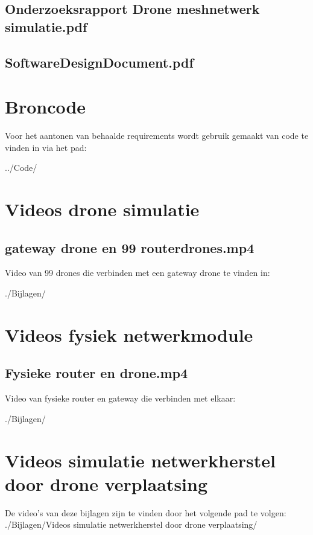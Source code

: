 \documentclass[a4paper, 11pt, oneside]{report}
\begin{document}
\section[Onderzoeksrapport Drone meshnetwerk simulatie]{Onderzoeksrapport Drone meshnetwerk simulatie.pdf}\label{sec:onderzoeksrapport-drone-meshnetwerk-simulatie}
\section[Softwaredesign document]{SoftwareDesignDocument.pdf}\label{sec:softwaredesigndocument}


\chapter{Broncode}
\label{app:broncode}
Voor het aantonen van behaalde requirements wordt gebruik gemaakt van code te vinden in via het pad:

../Code/

\chapter{Videos drone simulatie}
\section{gateway drone en 99 routerdrones.mp4}\label{sec:gateway-drone-en-99-routerdronesmp4}
Video van 99 drones die verbinden met een gateway drone te vinden in:

./Bijlagen/

\chapter{Videos fysiek netwerkmodule}
\section{Fysieke router en drone.mp4}\label{sec:fysieke-router-en-dronemp4}
Video van fysieke router en gateway die verbinden met elkaar:

./Bijlagen/

\chapter{Videos simulatie netwerkherstel door drone verplaatsing}\label{sec:videos-simulatie-netwerkherstel-door-drone-verplaatsing}
De video's van deze bijlagen zijn te vinden door het volgende pad te volgen: \newline
./Bijlagen/Videos simulatie netwerkherstel door drone verplaatsing/
\end{document}

